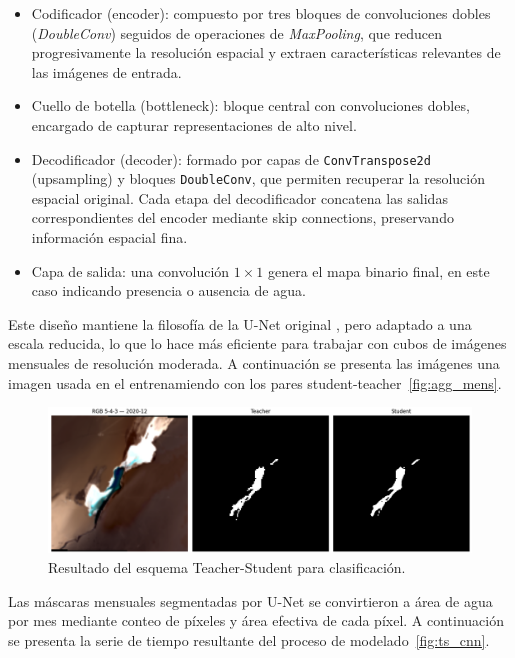 \begin{itemize}
    \item Codificador (encoder): compuesto por tres bloques de convoluciones dobles (\textit{DoubleConv}) seguidos de operaciones de \textit{MaxPooling}, que reducen progresivamente la resolución espacial y extraen características relevantes de las imágenes de entrada.

    \item Cuello de botella (bottleneck): bloque central con convoluciones dobles, encargado de capturar representaciones de alto nivel.

    \item Decodificador (decoder): formado por capas de \texttt{ConvTranspose2d} (upsampling) y bloques \texttt{DoubleConv}, que permiten recuperar la resolución espacial original. Cada etapa del decodificador concatena las salidas correspondientes del encoder mediante skip connections, preservando información espacial fina.

    \item Capa de salida: una convolución $1 \times 1$ genera el mapa binario final, en este caso indicando presencia o ausencia de agua.
\end{itemize}

Este diseño mantiene la filosofía de la U-Net original \parencite{ronneberger2015unet}, pero adaptado a una escala reducida, lo que lo hace más eficiente para trabajar con cubos de imágenes mensuales de resolución moderada. A continuación se presenta las imágenes una imagen usada en el entrenamiendo con los pares student-teacher~\ref{fig:agg_mens}.


\begin{figure}[ht]
        \centering
        \includegraphics[scale=.25]
        {Figures/student_teacher.png}
        \caption{Resultado del esquema Teacher-Student para clasificación.}
        \label{fig:class_2}
\end{figure}



Las máscaras mensuales segmentadas por U-Net se convirtieron a área de agua por mes mediante conteo de píxeles y área efectiva de cada píxel. A continuación se presenta la serie de tiempo resultante del proceso de modelado~\ref{fig:ts_cnn}.


